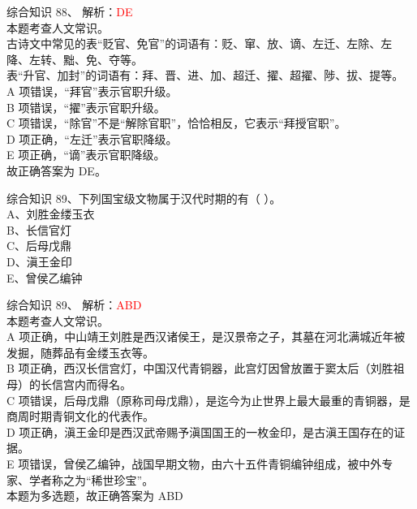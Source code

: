 \documentclass[aspectratio=169]{beamer}
\begin{document}
\begin{frame}[t]{综合知识}
    88、 解析：\textcolor{red}{DE}\\
    本题考查人文常识。\\
    古诗文中常见的表“贬官、免官”的词语有：贬、窜、放、谪、左迁、左除、左
    降、左转、黜、免、夺等。\\
    表“升官、加封”的词语有：拜、晋、进、加、超迁、擢、超擢、陟、拔、提等。\\
    A 项错误，“拜官”表示官职升级。\\
    B 项错误，“擢”表示官职升级。\\
    C 项错误，“除官”不是“解除官职”，恰恰相反，它表示“拜授官职”。\\
    D 项正确，“左迁”表示官职降级。\\
    E 项正确，“谪”表示官职降级。\\
    故正确答案为 DE。\\
\end{frame}                           



\begin{frame}[t]{综合知识}
    89、下列国宝级文物属于汉代时期的有（ ）。 \\
    A、刘胜金缕玉衣                           \\
    B、长信官灯                               \\
    C、后母戊鼎                               \\
    D、滇王金印                               \\
    E、曾侯乙编钟                             \\
\end{frame}                           

\begin{frame}[t]{综合知识}
    89、 解析：\textcolor{red}{ABD}\\
    本题考查人文常识。\\
    A 项正确，中山靖王刘胜是西汉诸侯王，是汉景帝之子，其墓在河北满城近年被发掘，随葬品有金缕玉衣等。\\
    B 项正确，西汉长信宫灯，中国汉代青铜器，此宫灯因曾放置于窦太后（刘胜祖母）的长信宫内而得名。\\
    C 项错误，后母戊鼎（原称司母戊鼎），是迄今为止世界上最大最重的青铜器，是商周时期青铜文化的代表作。\\
    D 项正确，滇王金印是西汉武帝赐予滇国国王的一枚金印，是古滇王国存在的证据。\\
    E 项错误，曾侯乙编钟，战国早期文物，由六十五件青铜编钟组成，被中外专家、学者称之为“稀世珍宝”。\\
    本题为多选题，故正确答案为 ABD\\
\end{frame}                           
\end{document}
